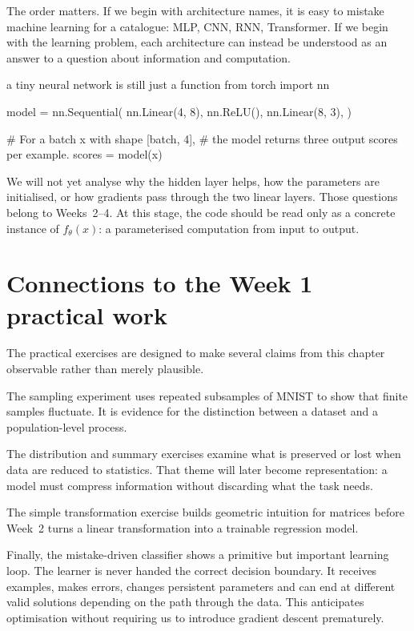 The order matters. If we begin with architecture names, it is easy to mistake machine learning for a catalogue: MLP, CNN, RNN, Transformer. If we begin with the learning problem, each architecture can instead be understood as an answer to a question about information and computation.

\begin{pytorchbox}{a tiny neural network is still just a function}
from torch import nn

model = nn.Sequential(
    nn.Linear(4, 8),
    nn.ReLU(),
    nn.Linear(8, 3),
)

# For a batch x with shape [batch, 4],
# the model returns three output scores per example.
scores = model(x)
\end{pytorchbox}

We will not yet analyse why the hidden layer helps, how the parameters are initialised, or how gradients pass through the two linear layers. Those questions belong to Weeks~2--4. At this stage, the code should be read only as a concrete instance of \(f_\theta(x)\): a parameterised computation from input to output.

\section{Connections to the Week 1 practical work}

The practical exercises are designed to make several claims from this chapter observable rather than merely plausible.

The sampling experiment uses repeated subsamples of MNIST to show that finite samples fluctuate. It is evidence for the distinction between a dataset and a population-level process.

The distribution and summary exercises examine what is preserved or lost when data are reduced to statistics. That theme will later become representation: a model must compress information without discarding what the task needs.

The simple transformation exercise builds geometric intuition for matrices before Week~2 turns a linear transformation into a trainable regression model.

Finally, the mistake-driven classifier shows a primitive but important learning loop. The learner is never handed the correct decision boundary. It receives examples, makes errors, changes persistent parameters and can end at different valid solutions depending on the path through the data. This anticipates optimisation without requiring us to introduce gradient descent prematurely.


